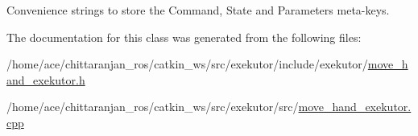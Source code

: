 \-Convenience strings to store the \-Command, \-State and \-Parameters meta-\/keys. 



\-The documentation for this class was generated from the following files\-:\begin{DoxyCompactItemize}
\item 
/home/ace/chittaranjan\-\_\-ros/catkin\-\_\-ws/src/exekutor/include/exekutor/\hyperlink{move__hand__exekutor_8h}{move\-\_\-hand\-\_\-exekutor.\-h}\item 
/home/ace/chittaranjan\-\_\-ros/catkin\-\_\-ws/src/exekutor/src/\hyperlink{move__hand__exekutor_8cpp}{move\-\_\-hand\-\_\-exekutor.\-cpp}\end{DoxyCompactItemize}
